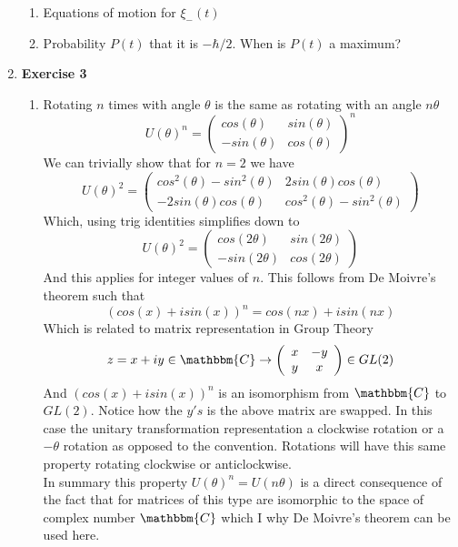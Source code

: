 \documentclass[12pt]{article}
\begin{document}
\begin{enumerate}
\begin{enumerate}
    \item Equations of motion for $\xi_{-}(t)$
    
    \item Probability $P(t)$ that it is $- \hbar /2$. When is $P(t)$ a maximum? 

\end{enumerate}

\item \textbf{Exercise 3} 

\begin{enumerate}
    \item Rotating $n$ times with angle $\theta$ is the same as rotating with an angle $n \theta$\\
    $$U(\theta)^n = \left(\begin{array}{cc} cos(\theta) & sin(\theta) \\ -sin(\theta) & cos(\theta) \end{array}\right)^n $$
    We can trivially show that for $n=2$ we have 
    $$ U(\theta)^2 = \left(\begin{array}{cc} cos^2(\theta)-sin^2(\theta) & 2sin(\theta)cos(\theta) \\ -2sin(\theta)cos(\theta) & cos^2(\theta)-sin^2 (\theta) \end{array}\right) $$
    Which, using trig identities simplifies down to 
    $$ U(\theta)^2 = \left(\begin{array}{cc} cos(2\theta) & sin(2\theta) \\ -sin(2\theta) & cos(2\theta) \end{array}\right) $$
    And this applies for integer values of $n$. This follows from De Moivre's theorem such that 
    $$ (cos(x) + isin(x))^n = cos(nx) + isin(nx) $$
    Which is related to matrix representation in Group Theory 
    $$ z = x + iy \in \mathbbm{C} \rightarrow \left(\begin{array}{cc} x & -y \\ y & x \end{array}\right) \in GL(2)  $$
    And $(cos(x) + isin(x))^n$ is an isomorphism from $\mathbbm{C}$ to $GL(2)$. Notice how the $y's$ is the above matrix are swapped. In this case the unitary transformation representation a clockwise rotation or a $-\theta$ rotation as opposed to the convention. Rotations will have this same property rotating clockwise or anticlockwise. \\
    In summary this property $U(\theta)^n = U(n \theta)$ is a direct consequence of the fact that for matrices of this type are isomorphic to the space of complex number $\mathbbm{C}$ which I why De Moivre's theorem can be used here. 
    

\end{enumerate}
\end{enumerate}
\end{document}
